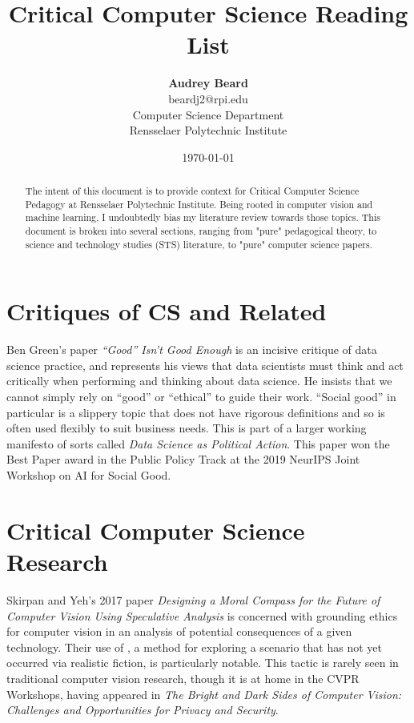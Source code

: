 \documentclass{article}
\title{Critical Computer Science Reading List}
\author{\textbf{Audrey Beard} \\
        beardj2@rpi.edu \\
        Computer Science Department \\
        Rensselaer Polytechnic Institute}
\date{\today}
\begin{document}
\maketitle

\begin{abstract}
    The intent of this document is to provide context for Critical Computer Science Pedagogy at Rensselaer Polytechnic Institute.
    Being rooted in computer vision and machine learning, I undoubtedly bias my literature review towards those topics.
    This document is broken into several sections, ranging from "pure" pedagogical theory, to science and technology studies (STS) literature, to "pure" computer science papers.
\end{abstract}
    
\section{Critiques of CS and Related}
    Ben Green's paper \textit{``Good'' Isn't Good Enough}\cite{greenGoodIsnGood2019} is an incisive critique of data science practice, and represents his views that data scientists must think and act critically when performing and thinking about data science.
    He insists that we cannot simply rely on ``good'' or ``ethical'' to guide their work. ``Social good'' in particular is a slippery topic that does not have rigorous definitions and so is often used flexibly to suit business needs.
    This is part of a larger working manifesto of sorts called \textit{Data Science as Political Action}\cite{greenDataSciencePolitical2019}.
    This paper won the Best Paper award in the Public Policy Track at the 2019 NeurIPS Joint Workshop on AI for Social Good.

\section{Critical Computer Science Research}
    
    Skirpan and Yeh's 2017 paper \textit{Designing a Moral Compass for the Future of Computer Vision Using Speculative Analysis }\cite{skirpanDesigningMoralCompass2017} is concerned with grounding ethics for computer vision in an analysis of potential consequences of a given technology. Their use of , a method for exploring a scenario that has not yet occurred via realistic fiction, is particularly notable.
    This tactic is rarely seen in traditional computer vision research, though it is at home in the CVPR Workshops, having appeared in \textit{The Bright and Dark Sides of Computer Vision: Challenges and Opportunities for Privacy and Security}.
    
\end{document}
